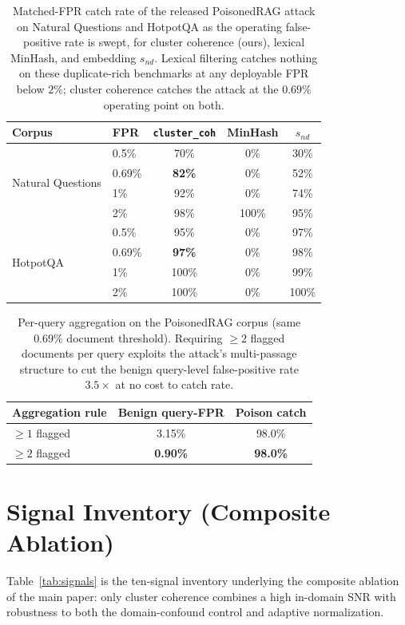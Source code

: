 \documentclass[conference]{IEEEtran}
\begin{document}
\begin{table}[htbp]
\centering
\caption{Matched-FPR catch rate of the released PoisonedRAG attack on Natural
Questions and HotpotQA as the operating false-positive rate is swept, for cluster
coherence (ours), lexical MinHash, and embedding $s_{nd}$. Lexical filtering catches
nothing on these duplicate-rich benchmarks at any deployable FPR below $2\%$; cluster coherence
catches the attack at the $0.69\%$ operating point on both.}
\label{tab:roc}
\begin{tabular}{llccc}
\toprule
Corpus & FPR & \texttt{cluster\_coh} & MinHash & $s_{nd}$ \\
\midrule
\multirow{4}{*}{Natural Questions}
 & 0.5\%  & 70\% & 0\%   & 30\% \\
 & 0.69\% & \textbf{82\%} & 0\% & 52\% \\
 & 1\%    & 92\% & 0\%   & 74\% \\
 & 2\%    & 98\% & 100\% & 95\% \\
\midrule
\multirow{4}{*}{HotpotQA}
 & 0.5\%  & 95\%  & 0\% & 97\% \\
 & 0.69\% & \textbf{97\%} & 0\% & 98\% \\
 & 1\%    & 100\% & 0\% & 99\% \\
 & 2\%    & 100\% & 0\% & 100\% \\
\bottomrule
\end{tabular}
\end{table}

\begin{table}[htbp]
\centering
\caption{Per-query aggregation on the PoisonedRAG corpus (same $0.69\%$ document
threshold). Requiring $\geq\!2$ flagged documents per query exploits the attack's
multi-passage structure to cut the benign query-level false-positive rate
$3.5\times$ at no cost to catch rate.}
\label{tab:agg}
\begin{tabular}{lcc}
\toprule
Aggregation rule & Benign query-FPR & Poison catch \\
\midrule
$\geq\!1$ flagged & 3.15\% & 98.0\% \\
$\geq\!2$ flagged & \textbf{0.90\%} & \textbf{98.0\%} \\
\bottomrule
\end{tabular}
\end{table}

\section{Signal Inventory (Composite Ablation)}
\label{app:signals}
Table~\ref{tab:signals} is the ten-signal inventory underlying the composite ablation of the
main paper: only cluster coherence combines a high in-domain SNR with robustness to both the
domain-confound control and adaptive normalization.
\end{document}
